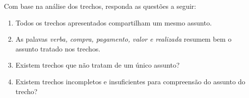 

\vspace{0.5 cm} 
\noindent Com base na análise dos trechos, responda as questões a seguir:
\vspace{0.5 cm} 


\begin{enumerate}



\item Todos os trechos apresentados compartilham um mesmo assunto.
\likert




\item As palavas \textit{verba, compra, pagamento, valor e realizada} resumem bem o assunto tratado nos trechos.
\likert




\item Existem trechos que não tratam de um único assunto?
\likert




\item Existem trechos incompletos e insuficientes para compreensão do assunto do trecho?
\likertA



\end{enumerate}







%
%
%
%
%
















